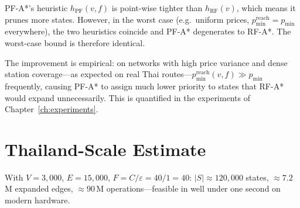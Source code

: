 PF-A*'s heuristic $h_{\mathrm{PF}}(v,f)$ is point-wise tighter than $h_{\mathrm{RF}}(v)$,
which means it prunes more states.
However, in the worst case (e.g.\ uniform prices, $p_{\min}^{\mathrm{reach}} = p_{\min}$
everywhere), the two heuristics coincide and PF-A* degenerates to RF-A*.
The worst-case bound is therefore identical.

The improvement is empirical: on networks with high price variance and dense station
coverage---as expected on real Thai routes---$p_{\min}^{\mathrm{reach}}(v,f) \gg p_{\min}$
frequently, causing PF-A* to assign much lower priority to states that RF-A* would expand
unnecessarily.
This is quantified in the experiments of Chapter~\ref{ch:experiments}.

\section{Thailand-Scale Estimate}

With $V = 3{,}000$, $E = 15{,}000$, $F = C/\varepsilon = 40/1 = 40$:
$|S| \approx 120{,}000$ states, $\approx 7.2$\,M expanded edges, $\approx 90$\,M operations---feasible
in well under one second on modern hardware.
